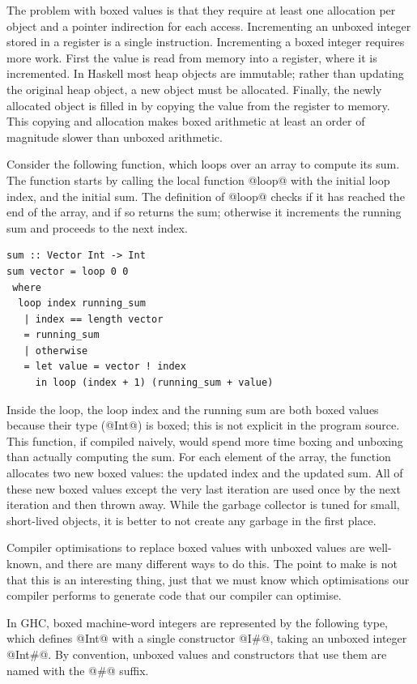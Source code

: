 The problem with boxed values is that they require at least one allocation per object and a pointer indirection for each access.
Incrementing an unboxed integer stored in a register is a single instruction.
Incrementing a boxed integer requires more work.
First the value is read from memory into a register, where it is incremented.
In Haskell most heap objects are immutable; rather than updating the original heap object, a new object must be allocated.
Finally, the newly allocated object is filled in by copying the value from the register to memory.
This copying and allocation makes boxed arithmetic at least an order of magnitude slower than unboxed arithmetic.

Consider the following function, which loops over an array to compute its sum.
The function starts by calling the local function @loop@ with the initial loop index, and the initial sum.
The definition of @loop@ checks if it has reached the end of the array, and if so returns the sum; otherwise it increments the running sum and proceeds to the next index.

\begin{lstlisting}
sum :: Vector Int -> Int
sum vector = loop 0 0
 where
  loop index running_sum
   | index == length vector
   = running_sum
   | otherwise
   = let value = vector ! index
     in loop (index + 1) (running_sum + value)
\end{lstlisting}

Inside the loop, the loop index and the running sum are both boxed values because their type (@Int@) is boxed; this is not explicit in the program source.
This function, if compiled naively, would spend more time boxing and unboxing than actually computing the sum.
For each element of the array, the function allocates two new boxed values: the updated index and the updated sum.
All of these new boxed values except the very last iteration are used once by the next iteration and then thrown away.
While the garbage collector is tuned for small, short-lived objects, it is better to not create any garbage in the first place.

Compiler optimisations to replace boxed values with unboxed values are well-known, and there are many different ways to do this.
The point to make is not that this is an interesting thing, just that we must know which optimisations our compiler performs to generate code that our compiler can optimise.

In GHC, boxed machine-word integers are represented by the following type, which defines @Int@ with a single constructor @I#@, taking an unboxed integer @Int#@. By convention, unboxed values and constructors that use them are named with the @#@ suffix.

